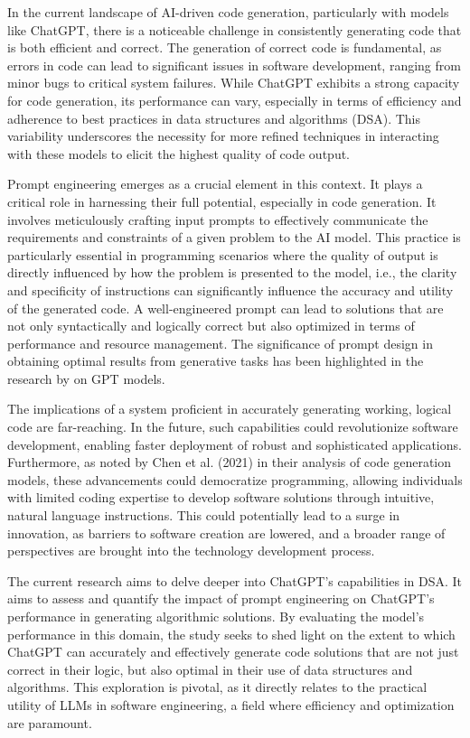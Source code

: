 In the current landscape of AI-driven code generation, particularly with models like ChatGPT, there is a noticeable challenge in consistently generating code that is both efficient and correct. The generation of correct code is fundamental, as errors in code can lead to significant issues in software development, ranging from minor bugs to critical system failures. While ChatGPT exhibits a strong capacity for code generation, its performance can vary, especially in terms of efficiency and adherence to best practices in data structures and algorithms (DSA). This variability underscores the necessity for more refined techniques in interacting with these models to elicit the highest quality of code output.

Prompt engineering emerges as a crucial element in this context. It plays a critical role in harnessing their full potential, especially in code generation. It involves meticulously crafting input prompts to effectively communicate the requirements and constraints of a given problem to the AI model. This practice is particularly essential in programming scenarios where the quality of output is directly influenced by how the problem is presented to the model, i.e., the clarity and specificity of instructions can significantly influence the accuracy and utility of the generated code. A well-engineered prompt can lead to solutions that are not only syntactically and logically correct but also optimized in terms of performance and resource management. The significance of prompt design in obtaining optimal results from generative tasks has been highlighted in the research by \cite{chen2021evaluating} on GPT models.

The implications of a system proficient in accurately generating working, logical code are far-reaching. In the future, such capabilities could revolutionize software development, enabling faster deployment of robust and sophisticated applications. Furthermore, as noted by Chen et al. (2021) in their analysis of code generation models, these advancements could democratize programming, allowing individuals with limited coding expertise to develop software solutions through intuitive, natural language instructions. This could potentially lead to a surge in innovation, as barriers to software creation are lowered, and a broader range of perspectives are brought into the technology development process.

The current research aims to delve deeper into ChatGPT’s capabilities in DSA. It aims to assess and quantify the impact of prompt engineering on ChatGPT’s performance in generating algorithmic solutions. By evaluating the model’s performance in this domain, the study seeks to shed light on the extent to which ChatGPT can accurately and effectively generate code solutions that are not just correct in their logic, but also optimal in their use of data structures and algorithms. This exploration is pivotal, as it directly relates to the practical utility of LLMs in software engineering, a field where efficiency and optimization are paramount.




